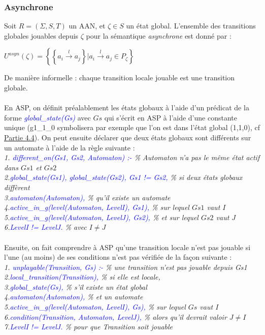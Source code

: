 \documentclass[10pt,a4paper]{article}
\begin{document}
\subsubsection{Asynchrone}
Soit $R = (\Sigma,S,T)$ un AAN, et $\zeta\in S$ un état global. L'ensemble des transitions globales jouables depuis $\zeta$ pour la sémantique \emph{asynchrone} est donné par :
\begin{center}
	$U^{asyn}(\zeta)=\left\{\left\{a_i\xrightarrow{l} a_j\right\}|a_i\xrightarrow{l} a_j\in P_{\zeta}\right\}$
\end{center}
De manière informelle : chaque transition locale jouable est une transition globale.\\ \\
En ASP, on définit préalablement les états globaux à l'aide d'un prédicat de la forme \emph{\textcolor{blue}{global\_state(Gs)}} avec $Gs$ qui s'écrit en ASP à l'aide d'une constante unique (g1\_1\_0 symbolisera par exemple que 
l'on est dans l'état global (1,1,0), cf \hyperlink{partie4.4}{Partie 4.4}). On peut ensuite déclarer que deux états globaux sont différents sur un automate à l'aide de la règle suivante :\\
\emph{
1. \textcolor{blue}{different\_on(Gs1, Gs2, Automaton) :-} \% Automaton n'a pas le même état actif dans $Gs1$ et $Gs2$\\
2.\qquad \textcolor{blue}{global\_state(Gs1), global\_state(Gs2), Gs1 != Gs2,} \% si deux états globaux diffèrent\\
3.\qquad \textcolor{blue}{automaton(Automaton),} \% qu'il existe un automate\\
4.\qquad \textcolor{blue}{active\_in\_g(level(Automaton, LevelI), Gs1),} \% sur lequel $Gs1$ vaut $I$\\
5.\qquad \textcolor{blue}{active\_in\_g(level(Automaton, LevelJ), Gs2),} \% et sur lequel $Gs2$ vaut $J$\\
6.\qquad \textcolor{blue}{LevelI != LevelJ.} \% avec $I \neq J$\\ \\
}
Ensuite, on fait comprendre à ASP qu'une transition locale n'est pas jouable si l'une (au moins) de ses conditions n'est pas vérifiée de la façon suivante :\\
\emph{
1. \textcolor{blue}{unplayable(Transition, Gs) :-} \% une transition n'est pas jouable depuis Gs1\\
2.\qquad \textcolor{blue}{local\_transition(Transition),} \% si elle est locale,\\
3.\qquad \textcolor{blue}{global\_state(Gs),} \% s'il existe un état global\\
4.\qquad \textcolor{blue}{automaton(Automaton),} \% et un automate\\
5.\qquad \textcolor{blue}{active\_in\_g(level(Automaton, LevelI), Gs),} \% sur lequel $Gs$ vaut $I$\\
6.\qquad \textcolor{blue}{condition(Transition, Automaton, LevelJ),} \% alors qu'il devrait valoir $J\neq I$\\
7.\qquad \textcolor{blue}{LevelI != LevelJ.} \% pour que Transition soit jouable\\ \\
}
\end{document}
